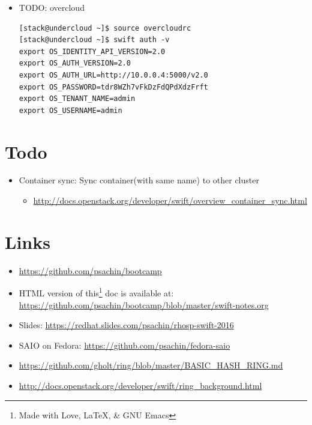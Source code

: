 \documentclass{article}
\begin{document}
\begin{itemize}
\item TODO: overcloud

\begin{verbatim}
[stack@undercloud ~]$ source overcloudrc
[stack@undercloud ~]$ swift auth -v
export OS_IDENTITY_API_VERSION=2.0
export OS_AUTH_VERSION=2.0
export OS_AUTH_URL=http://10.0.0.4:5000/v2.0
export OS_PASSWORD=tdr8WZh7vFkDzFdQPdXdzFrft
export OS_TENANT_NAME=admin
export OS_USERNAME=admin
\end{verbatim}
\end{itemize}

\section{Todo}
\label{sec:org632cca1}
\begin{itemize}
\item Container sync: Sync container(with same name) to other cluster
\begin{itemize}
\item \url{http://docs.openstack.org/developer/swift/overview\_container\_sync.html}
\end{itemize}
\end{itemize}

\section{Links}
\label{sec:org138ccd1}
\begin{itemize}
\item \url{https://github.com/psachin/bootcamp}
\item HTML version of this\footnote[1]{Made with Love, \LaTeX, \& GNU Emacs} doc is available at: \newline
\url{https://github.com/psachin/bootcamp/blob/master/swift-notes.org}
\item Slides: \url{https://redhat.slides.com/psachin/rhosp-swift-2016}
\item SAIO on Fedora: \url{https://github.com/psachin/fedora-saio}
\item \url{https://github.com/gholt/ring/blob/master/BASIC\_HASH\_RING.md}
\item \url{http://docs.openstack.org/developer/swift/ring\_background.html}
\end{itemize}

\end{document}
